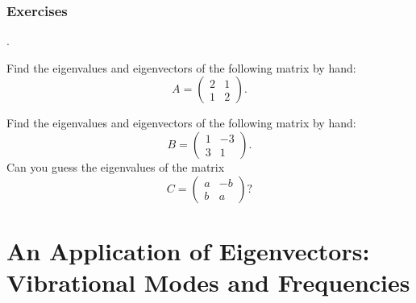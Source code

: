 \subsection*{Exercises}
\begin{list}
{.}{}

\item Find the eigenvalues and eigenvectors of the following
      matrix by hand:
$$
A = \left(\begin{array}{cc} 2 & 1 \\
                            1 & 2
                    \end{array} \right).
$$


\item Find the eigenvalues and eigenvectors of the following
      matrix by hand:
$$
B = \left(\begin{array}{cc} 1 & -3 \\
                            3 &  1
                    \end{array} \right).
$$
Can you guess the eigenvalues of the matrix
$$
C = \left(\begin{array}{cc} a & -b \\
                            b &  a
                    \end{array} \right)?
$$
\end{list}




\chapter[Vibrational Modes and Frequencies]{An Application of Eigenvectors: Vibrational Modes and Frequencies}

